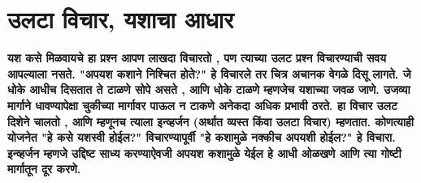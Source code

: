 \chapter{उलटा विचार, यशाचा आधार}

\textcolor{blue!60!black}{\textbf{यश कसे मिळवायचे हा प्रश्न आपण लाखदा विचारतो , पण त्याच्या उलट प्रश्न विचारण्याची सवय आपल्याला नसते. "अपयश कशाने निश्चित होते?" हे विचारले तर चित्र अचानक वेगळे दिसू लागते. जे धोके आधीच दिसतात ते टाळणे सोपे असते , आणि धोके टाळणे म्हणजेच यशाच्या जवळ जाणे. उजव्या मार्गाने धावण्यापेक्षा चुकीच्या मार्गावर पाऊल न टाकणे अनेकदा अधिक प्रभावी ठरते. हा विचार उलट दिशेने चालतो , आणि म्हणूनच त्याला इन्व्हर्जन (अर्थात व्यस्त किंवा उलटा विचार) म्हणतात. कोणत्याही योजनेत "हे कसे यशस्वी होईल?" विचारण्यापूर्वी "हे कशामुळे नक्कीच अपयशी होईल?" हे विचारा. इन्व्हर्जन म्हणजे उद्दिष्ट साध्य करण्याऐवजी अपयश कशामुळे येईल हे आधी ओळखणे आणि त्या गोष्टी मार्गातून दूर करणे.}}

